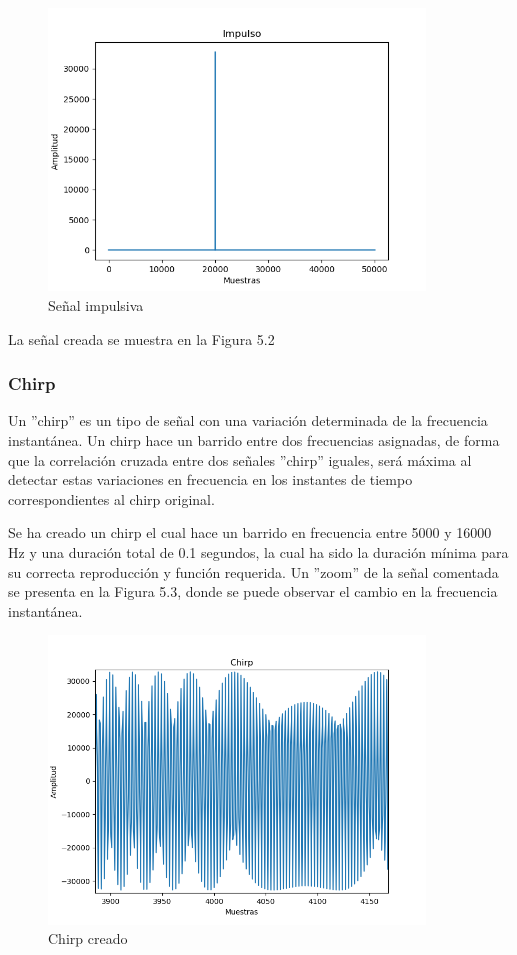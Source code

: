 \documentclass[a4paper,11pt]{book}
\begin{document}
\begin{figure}[hbtp]
\centering
\includegraphics[width = 10cm]{FIGURAS/impulso.png}
\caption{Señal impulsiva}
\end{figure}


La señal creada se muestra en la Figura 5.2

\subsubsection{Chirp}
Un ''chirp'' es un tipo de señal con una variación determinada de la frecuencia instantánea. Un chirp hace un barrido entre dos frecuencias asignadas, de forma que la correlación cruzada entre dos señales ''chirp'' iguales, será máxima al detectar estas variaciones en frecuencia en los instantes de tiempo correspondientes al chirp original.

Se ha creado un chirp el cual hace un barrido en frecuencia entre 5000 y 16000 Hz y una duración total de 0.1 segundos, la cual ha sido la duración mínima para su correcta reproducción y función requerida. Un ''zoom'' de la señal comentada se presenta en la Figura 5.3, donde se puede observar el cambio en la frecuencia instantánea.

\begin{figure}[hbtp]
\centering
\includegraphics[width = 10cm]{FIGURAS/chiirp.png}
\caption{Chirp creado}
\end{figure}
\end{document}
